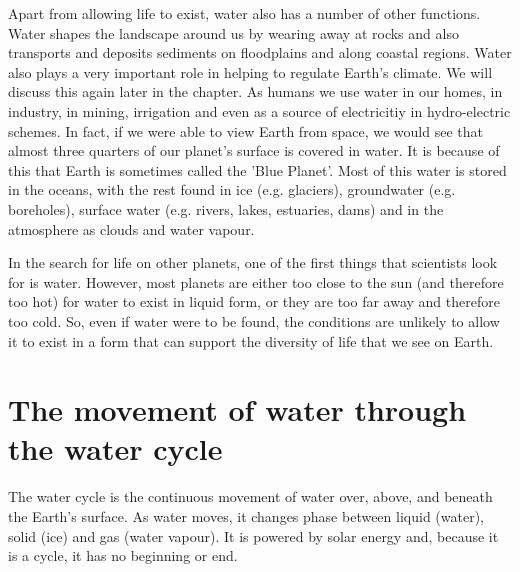 Apart from allowing life to exist, water also has a number of other functions. Water shapes the landscape around us by wearing away at rocks and also transports and deposits sediments on floodplains and along coastal regions. Water also plays a very important role in helping to regulate Earth's climate. We will discuss this again later in the chapter. As humans we use water in our homes, in industry, in mining, irrigation and even as a source of electricitiy in hydro-electric schemes. In fact, if we were able to view Earth from space, we would see that almost three quarters of our planet's surface is covered in water. It is because of this that Earth is sometimes called the 'Blue Planet'. Most of this water is stored in the oceans, with the rest found in ice (e.g. glaciers), groundwater (e.g. boreholes), surface water (e.g. rivers, lakes, estuaries, dams) and in the atmosphere as clouds and water vapour.\\

\begin{IFact}{In the search for life on other planets, one of the first things that scientists look for is water. However, most planets are either too close to the sun (and therefore too hot) for water to exist in liquid form, or they are too far away and therefore too cold. So, even if water were to be found, the conditions are unlikely to allow it to exist in a form that can support the diversity of life that we see on Earth.}
\end{IFact}







\section{The movement of water through the water cycle}

The water cycle is the continuous movement of water over, above, and beneath the Earth's surface. As water moves, it changes phase between liquid (water), solid (ice) and gas (water vapour). It is powered by solar energy and, because it is a cycle, it has no beginning or end.


